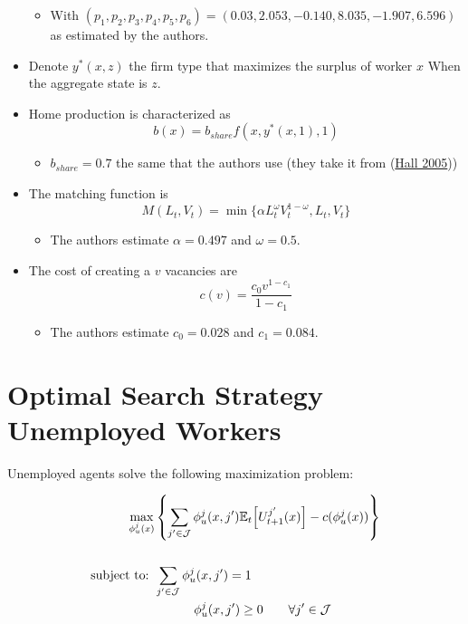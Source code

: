 \documentclass[
  letterpaper,
  DIV=11,
  numbers=noendperiod]{scrreprt}
\providecommand{\tightlist}{%
  \setlength{\itemsep}{0pt}\setlength{\parskip}{0pt}}\usepackage{longtable,booktabs,array}
\begin{document}
\begin{itemize}
  \begin{itemize}
  \tightlist
  \item
    With
    \((p_1, p_2, p_3, p_4, p_5, p_6) = (0.03, 2.053, -0.140, 8.035, -1.907, 6.596)\)
    as estimated by the authors.
  \end{itemize}
\item
  Denote \(y^*(x,z)\) the firm type that maximizes the surplus of worker
  \(x\) When the aggregate state is \(z\).
\item
  Home production is characterized as
  \[b(x) = b_{share} f(x,y^*(x,1),1)\]

  \begin{itemize}
  \tightlist
  \item
    \(b_{share} = 0.7\) the same that the authors use (they take it from
    (\protect\hyperlink{ref-hallEmploymentFluctuationsEquilibrium2005}{Hall
    2005}))
  \end{itemize}
\item
  The matching function is
  \[M(L_t, V_t) = \min\{\alpha L_t^{\omega}V_t^{1-\omega}, L_t, V_t\}\]

  \begin{itemize}
  \tightlist
  \item
    The authors estimate \(\alpha = 0.497\) and \(\omega=0.5\).
  \end{itemize}
\item
  The cost of creating a \(v\) vacancies are
  \[c(v) = \frac{c_0 v^{1-c_1}}{1 - c_1}\]

  \begin{itemize}
  \tightlist
  \item
    The authors estimate \(c_0 = 0.028\) and \(c_1 = 0.084\).
  \end{itemize}
\end{itemize}

\appendix
{}

\hypertarget{sec-appendix_search_unemp}{%
\chapter{Optimal Search Strategy Unemployed
Workers}\label{sec-appendix_search_unemp}}

Unemployed agents solve the following maximization problem:

\begin{align*}
    \max_{\phi^j_u(x)}&\left\{ \sum_{j'\in\mathcal{J}}\phi^j_u(x, j')\mathbb{E}_t\Big[U^{j'}_{t+1}(x)  \Big] -c(\phi^j_u(x)) \right\} \\ \\
    \text{subject to: } & \sum_{j'\in \mathcal{J}}\phi^j_u(x, j') = 1 \\
    & \hspace{1.1 cm} \phi^j_u(x, j') \geq 0 \qquad \forall j'\in \mathcal{J}
\end{align*}
\end{document}
